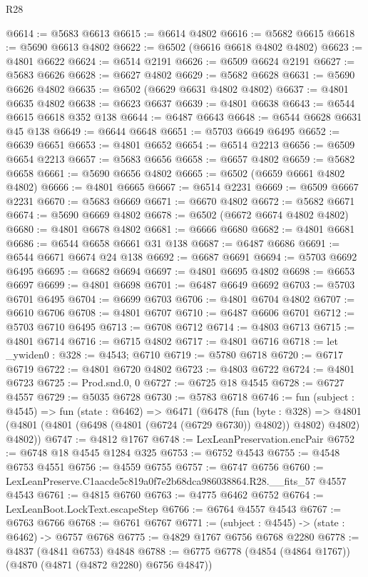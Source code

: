 \begin{lexlean}{R28}
\begin{coremodule}
@6614 := @5683 @6613
@6615 := @6614 @4802
@6616 := @5682 @6615
@6618 := @5690 @6613 @4802
@6622 := @6502 (@6616 @6618 @4802 @4802)
@6623 := @4801 @6622
@6624 := @6514 @2191
@6626 := @6509 @6624 @2191
@6627 := @5683 @6626
@6628 := @6627 @4802
@6629 := @5682 @6628
@6631 := @5690 @6626 @4802
@6635 := @6502 (@6629 @6631 @4802 @4802)
@6637 := @4801 @6635 @4802
@6638 := @6623 @6637
@6639 := @4801 @6638
@6643 := @6544 @6615 @6618 @352 @138
@6644 := @6487 @6643
@6648 := @6544 @6628 @6631 @45 @138
@6649 := @6644 @6648
@6651 := @5703 @6649 @6495
@6652 := @6639 @6651
@6653 := @4801 @6652
@6654 := @6514 @2213
@6656 := @6509 @6654 @2213
@6657 := @5683 @6656
@6658 := @6657 @4802
@6659 := @5682 @6658
@6661 := @5690 @6656 @4802
@6665 := @6502 (@6659 @6661 @4802 @4802)
@6666 := @4801 @6665
@6667 := @6514 @2231
@6669 := @6509 @6667 @2231
@6670 := @5683 @6669
@6671 := @6670 @4802
@6672 := @5682 @6671
@6674 := @5690 @6669 @4802
@6678 := @6502 (@6672 @6674 @4802 @4802)
@6680 := @4801 @6678 @4802
@6681 := @6666 @6680
@6682 := @4801 @6681
@6686 := @6544 @6658 @6661 @31 @138
@6687 := @6487 @6686
@6691 := @6544 @6671 @6674 @24 @138
@6692 := @6687 @6691
@6694 := @5703 @6692 @6495
@6695 := @6682 @6694
@6697 := @4801 @6695 @4802
@6698 := @6653 @6697
@6699 := @4801 @6698
@6701 := @6487 @6649 @6692
@6703 := @5703 @6701 @6495
@6704 := @6699 @6703
@6706 := @4801 @6704 @4802
@6707 := @6610 @6706
@6708 := @4801 @6707
@6710 := @6487 @6606 @6701
@6712 := @5703 @6710 @6495
@6713 := @6708 @6712
@6714 := @4803 @6713
@6715 := @4801 @6714
@6716 := @6715 @4802
@6717 := @4801 @6716
@6718 := let _ywiden0 : @328 := @4543; @6710
@6719 := @5780 @6718
@6720 := @6717 @6719
@6722 := @4801 @6720 @4802
@6723 := @4803 @6722
@6724 := @4801 @6723
@6725 := Prod.snd.{0, 0}
@6727 := @6725 @18 @4545
@6728 := @6727 @4557
@6729 := @5035 @6728
@6730 := @5783 @6718
@6746 := fun (subject : @4545) =>
  fun (state : @6462) =>
  @6471
    (@6478
      (fun (byte : @328) =>
      @4801 (@4801 (@4801 (@6498 (@4801 (@6724 (@6729 @6730)) @4802)) @4802) @4802) @4802))
@6747 := @4812 @1767
@6748 := LexLeanPreservation.encPair
@6752 := @6748 @18 @4545 @1284 @325
@6753 := @6752 @4543
@6755 := @4548 @6753 @4551
@6756 := @4559 @6755
@6757 := @6747 @6756
@6760 := LexLeanPreserve.C1aacde5c819a0f7e2b68dca986038864.R28.__fits_57 @4557 @4543
@6761 := @4815 @6760
@6763 := @4775 @6462 @6752
@6764 := LexLeanBoot.LockText.escapeStep
@6766 := @6764 @4557 @4543
@6767 := @6763 @6766
@6768 := @6761 @6767
@6771 := (subject : @4545) -> (state : @6462) -> @6757 @6768
@6775 := @4829 @1767 @6756 @6768 @2280
@6778 := @4837 (@4841 @6753) @4848
@6788 := @6775 @6778 (@4854 (@4864 @1767)) (@4870 (@4871 (@4872 @2280) @6756 @4847))

\end{coremodule}
\end{lexlean}
